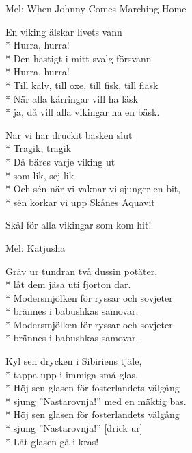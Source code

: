 \begin{SongText}[Vikingen]
    \begin{SongInfo}
        Mel: When Johnny Comes Marching Home
    \end{SongInfo}
    \begin{SongVerse}
        En viking älskar livets vann\\*%
        Hurra, hurra!\\*%
        Den hastigt i mitt svalg försvann\\*%
        Hurra, hurra!\\*%
        Till kalv, till oxe, till fisk, till fläsk\\*%
        När alla kärringar vill ha läsk\\*%
        ja, då vill alla vikingar ha en bäsk.
    \end{SongVerse}
    \begin{SongVerse}
        När vi har druckit bäsken slut\\*%
        Tragik, tragik\\*%
        Då bäres varje viking ut\\*%
        som lik, sej lik\\*%
        Och sén när vi vaknar vi sjunger en bit,\\*%
        sén korkar vi upp Skånes Aquavit
    \end{SongVerse}
    \begin{SongVerse}
        Skål för alla vikingar som kom hit!
    \end{SongVerse}
\end{SongText}
\begin{SongText}
    \begin{SongInfo}
        Mel: Katjusha
    \end{SongInfo}
    \begin{SongVerse}
        Gräv ur tundran två dussin potäter,\\*%
        låt dem jäsa uti fjorton dar.\\*%
        Modersmjölken för ryssar och sovjeter\\*%
        brännes i babushkas samovar.\\*%
        Modersmjölken för ryssar och sovjeter\\*%
        brännes i babushkas samovar.
    \end{SongVerse}
    \begin{SongVerse}
        Kyl sen drycken i Sibiriens tjäle,\\*%
        tappa upp i immiga små glas.\\*%
        Höj sen glasen för fosterlandets välgång\\*%
        sjung ”Nastarovnja!” med en mäktig bas.\\*%
        Höj sen glasen för fosterlandets välgång\\*%
        sjung ”Nastarovnja!” [drick ur]\\*%
        Låt glasen gå i kras!
    \end{SongVerse}
\end{SongText}
